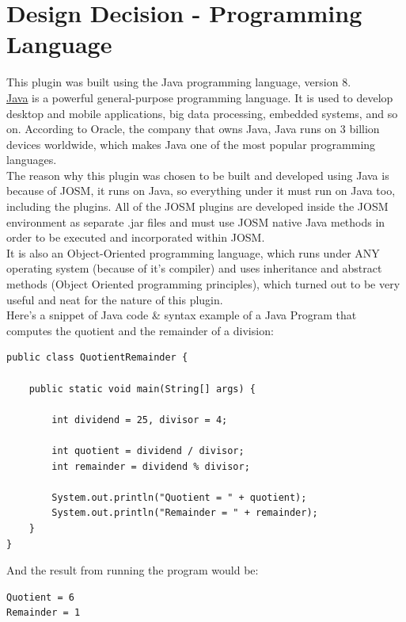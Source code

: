 \section{Design Decision - Programming Language}
This plugin was built using the Java programming language, version 8.\\
\newline
\href{https://www.java.com/en/}{Java} is a powerful general-purpose programming language. It is used to develop desktop and mobile applications, big data processing, embedded systems, and so on. According to Oracle, the company that owns Java, Java runs on 3 billion devices worldwide, which makes Java one of the most popular programming languages. \cite{WhatIsJava}\\
\newline
The reason why this plugin was chosen to be built and developed using Java is because of JOSM, it runs on Java, so everything under it must run on Java too, including the plugins. All of the JOSM plugins are developed inside the JOSM environment as separate .jar files and must use JOSM native Java methods in order to be executed and incorporated within JOSM.\\
It is also an Object-Oriented programming language, which runs under ANY operating system (because of it's compiler) and uses inheritance and abstract methods (Object Oriented programming principles), which turned out to be very useful and neat for the nature of this plugin.\\
\newline
Here's a snippet of Java code \& syntax example of a Java Program that computes the quotient and the remainder of a division: \cite{JavaExampleQuadraticEquation}
\begin{verbatim}
public class QuotientRemainder {
	
	public static void main(String[] args) {
		
		int dividend = 25, divisor = 4;
		
		int quotient = dividend / divisor;
		int remainder = dividend % divisor;
		
		System.out.println("Quotient = " + quotient);
		System.out.println("Remainder = " + remainder);
	}
}
\end{verbatim}
And the result from running the program would be:
\begin{verbatim}
Quotient = 6
Remainder = 1
\end{verbatim}
\newpage
